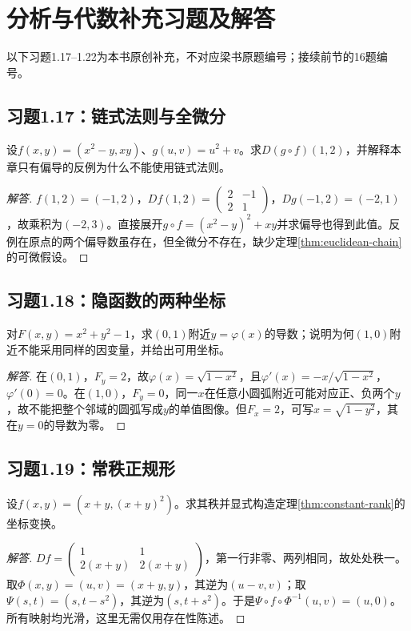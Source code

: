 \section{分析与代数补充习题及解答}
以下习题1.17--1.22为本书原创补充，不对应梁书原题编号；接续前节的16题编号。
\subsection*{习题1.17：链式法则与全微分}
设$f(x,y)=(x^2-y,xy)$、$g(u,v)=u^2+v$。求$D(g\circ f)(1,2)$，并解释本章只有偏导的反例为什么不能使用链式法则。
\begin{proof}[解答]
$f(1,2)=(-1,2)$，$Df(1,2)=\left(\begin{smallmatrix}2&-1\\2&1\end{smallmatrix}\right)$，$Dg(-1,2)=(-2,1)$，故乘积为$(-2,3)$。直接展开$g\circ f=(x^2-y)^2+xy$并求偏导也得到此值。反例在原点的两个偏导数虽存在，但全微分不存在，缺少定理\ref{thm:euclidean-chain}的可微假设。
\end{proof}
\subsection*{习题1.18：隐函数的两种坐标}
对$F(x,y)=x^2+y^2-1$，求$(0,1)$附近$y=\varphi(x)$的导数；说明为何$(1,0)$附近不能采用同样的因变量，并给出可用坐标。
\begin{proof}[解答]
在$(0,1)$，$F_y=2$，故$\varphi(x)=\sqrt{1-x^2}$，且$\varphi'(x)=-x/\sqrt{1-x^2}$，$\varphi'(0)=0$。在$(1,0)$，$F_y=0$，同一$x$在任意小圆弧附近可能对应正、负两个$y$，故不能把整个邻域的圆弧写成$y$的单值图像。但$F_x=2$，可写$x=\sqrt{1-y^2}$，其在$y=0$的导数为零。
\end{proof}
\subsection*{习题1.19：常秩正规形}
设$f(x,y)=(x+y,(x+y)^2)$。求其秩并显式构造定理\ref{thm:constant-rank}的坐标变换。
\begin{proof}[解答]
$Df=\left(\begin{smallmatrix}1&1\\2(x+y)&2(x+y)\end{smallmatrix}\right)$，第一行非零、两列相同，故处处秩一。取$\Phi(x,y)=(u,v)=(x+y,y)$，其逆为$(u-v,v)$；取$\Psi(s,t)=(s,t-s^2)$，其逆为$(s,t+s^2)$。于是$\Psi\circ f\circ\Phi^{-1}(u,v)=(u,0)$。所有映射均光滑，这里无需仅用存在性陈述。
\end{proof}
